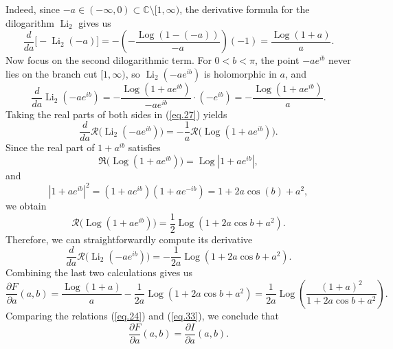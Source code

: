 \documentclass[preprint,12pt,nopreprintline]{elsarticle}
\begin{document}
Indeed, since \(-a\in (-\infty,0)\subset \mathbb{C}\setminus [1,\infty)\), the derivative
formula for the dilogarithm \(\operatorname{Li}_2\) gives us
\begin{equation}
\frac{d}{da}\bigl[-\operatorname{Li}_2(-a)\bigr]
=
-\left(
-\frac{\operatorname{Log}(1-(-a))}{-a}
\right)(-1)
=
\frac{\operatorname{Log}(1+a)}{a}.
\end{equation}
Now focus on the second dilogarithmic term. For \(0<b<\pi\), the point \(-ae^{ib}\) never
lies on the branch cut \([1,\infty)\), so \(\operatorname{Li}_2(-ae^{ib})\) is holomorphic in \(a\), and
\begin{equation}\label{eq.27}
\frac{d}{da}\operatorname{Li}_2(-ae^{ib})
=
-\frac{\operatorname{Log}(1+ae^{ib})}{-ae^{ib}}\cdot (-e^{ib})
=
-\frac{\operatorname{Log}(1+ae^{ib})}{a}.
\end{equation}
Taking the real parts of both sides in (\ref{eq.27}) yields
\begin{equation}
\frac{d}{da}\mathscr{R}\!\bigl(\operatorname{Li}_2(-ae^{ib})\bigr)
=
-\frac{1}{a}\mathscr{R}\!\bigl(\operatorname{Log}(1+ae^{ib})\bigr).
\end{equation}
Since the real part of \(1+a^{ib}\) satisfies
\begin{equation}
\Re\!\bigl(\operatorname{Log}(1+ae^{ib})\bigr)=\operatorname{Log}|1+ae^{ib}|,
\end{equation}
and
\begin{equation}
|1+ae^{ib}|^2
=
(1+ae^{ib})(1+ae^{-ib})
=
1+2a\cos \left(b\right)+a^2,
\end{equation}
we obtain
\begin{equation}
\mathscr{R}\!\bigl(\operatorname{Log}(1+ae^{ib})\bigr)
=
\frac{1}{2}\operatorname{Log}(1+2a\cos b+a^2).
\end{equation}
Therefore, we can straightforwardly compute its derivative
\begin{equation}
\frac{d}{da}\mathscr{R}\!\bigl(\operatorname{Li}_2(-ae^{ib})\bigr)
=
-\frac{1}{2a}\operatorname{Log}(1+2a\cos b+a^2).
\end{equation}
Combining the last two calculations gives us
\begin{equation}\label{eq.33}
\frac{\partial F}{\partial a}(a,b)
=
\frac{\operatorname{Log}(1+a)}{a}
-\frac{1}{2a}\operatorname{Log}(1+2a\cos b+a^2)
=
\frac{1}{2a}
\operatorname{Log}\!\left(\frac{(1+a)^2}{1+2a\cos b+a^2}\right).
\end{equation}
Comparing the relations (\ref{eq.24}) and (\ref{eq.33}), we conclude that
\begin{equation}
\frac{\partial F}{\partial a}(a,b)=\frac{\partial I}{\partial a}(a,b).
\end{equation}
\end{document}
